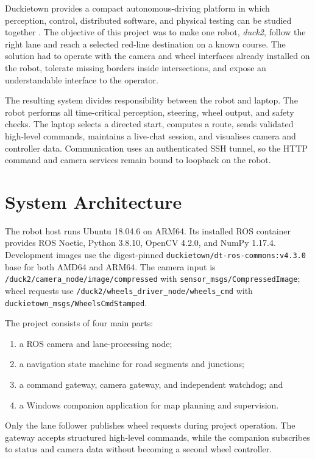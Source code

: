 \documentclass[10pt,a4paper,twocolumn]{article}
\newcommand{\code}[1]{\texttt{#1}}
\begin{document}
Duckietown provides a compact autonomous-driving platform in which perception,
control, distributed software, and physical testing can be studied together
\cite{paull2017duckietown}. The objective of this project was to make one robot,
\emph{duck2}, follow the right lane and reach a selected red-line destination on
a known course. The solution had to operate with the camera and wheel interfaces
already installed on the robot, tolerate missing borders inside intersections,
and expose an understandable interface to the operator.

The resulting system divides responsibility between the robot and laptop. The
robot performs all time-critical perception, steering, wheel output, and safety
checks. The laptop selects a directed start, computes a route, sends validated
high-level commands, maintains a live-chat session, and visualises camera and controller data. Communication
uses an authenticated SSH tunnel, so the HTTP command and camera services remain
bound to loopback on the robot.

\section{System Architecture}

The robot host runs Ubuntu 18.04.6 on ARM64. Its installed ROS container
provides ROS Noetic, Python 3.8.10, OpenCV 4.2.0, and NumPy 1.17.4. Development images use the digest-pinned
\code{duckietown/dt-ros-commons:v4.3.0} base for both AMD64 and ARM64. The
camera input is \code{/duck2/camera\_node/image/compressed} with
\code{sensor\_msgs/CompressedImage}; wheel requests use
\code{/duck2/wheels\_driver\_node/wheels\_cmd} with
\code{duckietown\_msgs/WheelsCmdStamped}.

The project consists of four main parts:

\begin{enumerate}
    \item a ROS camera and lane-processing node;
    \item a navigation state machine for road segments and junctions;
    \item a command gateway, camera gateway, and independent watchdog; and
    \item a Windows companion application for map planning and supervision.
\end{enumerate}

Only the lane follower publishes wheel requests during project operation. The
gateway accepts structured high-level commands, while the companion subscribes
to status and camera data without becoming a second wheel controller.
\end{document}
